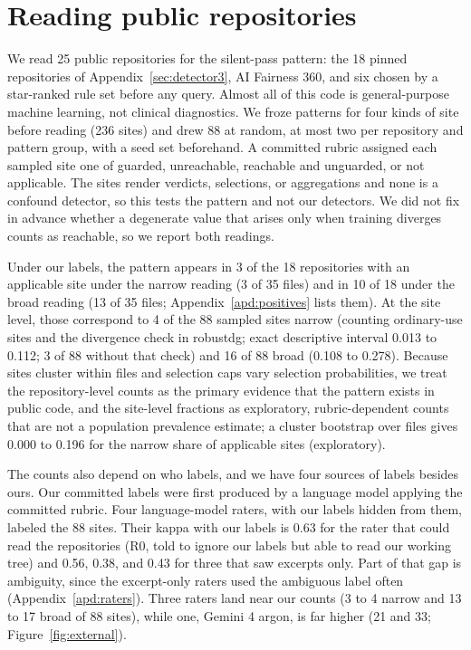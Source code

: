 \documentclass[10pt]{article}
\theoremstyle{definition}
\begin{document}
\section{Reading public repositories}
\label{apd:repos}
We read 25 public repositories for the silent-pass pattern: the 18 pinned repositories of Appendix~\ref{sec:detector3}, AI Fairness 360, and six chosen by a star-ranked rule set before any query. Almost all of this code is general-purpose machine learning, not clinical diagnostics. We froze patterns for four kinds of site before reading (236 sites) and drew 88 at random, at most two per repository and pattern group, with a seed set beforehand. A committed rubric assigned each sampled site one of guarded, unreachable, reachable and unguarded, or not applicable. The sites render verdicts, selections, or aggregations and none is a confound detector, so this tests the pattern and not our detectors. We did not fix in advance whether a degenerate value that arises only when training diverges counts as reachable, so we report both readings.

Under our labels, the pattern appears in 3 of the 18 repositories with an applicable site under the narrow reading (3 of 35 files) and in 10 of 18 under the broad reading (13 of 35 files; Appendix~\ref{apd:positives} lists them). At the site level, those correspond to 4 of the 88 sampled sites narrow (counting ordinary-use sites and the divergence check in robustdg; exact descriptive interval 0.013 to 0.112; 3 of 88 without that check) and 16 of 88 broad (0.108 to 0.278). Because sites cluster within files and selection caps vary selection probabilities, we treat the repository-level counts as the primary evidence that the pattern exists in public code, and the site-level fractions as exploratory, rubric-dependent counts that are not a population prevalence estimate; a cluster bootstrap over files gives 0.000 to 0.196 for the narrow share of applicable sites (exploratory).

The counts also depend on who labels, and we have four sources of labels besides ours. Our committed labels were first produced by a language model applying the committed rubric. Four language-model raters, with our labels hidden from them, labeled the 88 sites. Their kappa with our labels is 0.63 for the rater that could read the repositories (R0, told to ignore our labels but able to read our working tree) and 0.56, 0.38, and 0.43 for three that saw excerpts only. Part of that gap is ambiguity, since the excerpt-only raters used the ambiguous label often (Appendix~\ref{apd:raters}). Three raters land near our counts (3 to 4 narrow and 13 to 17 broad of 88 sites), while one, Gemini 4 argon, is far higher (21 and 33; Figure~\ref{fig:external}).
\end{document}
